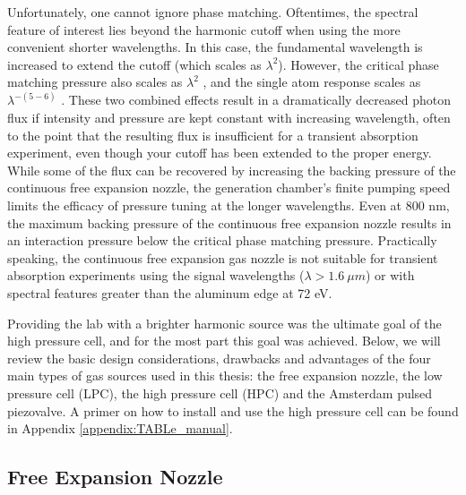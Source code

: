 Unfortunately, one cannot ignore phase matching. Oftentimes, the spectral feature of interest lies beyond the harmonic cutoff when using the more convenient shorter wavelengths. In this case, the fundamental wavelength is increased to extend the cutoff (which scales as $\lambda^2$). However, the critical phase matching pressure also scales as $\lambda^2$ \cite{popmintchevPhaseMatchingHigh2009}, and the single atom response scales as $\lambda^{-(5-6)}$ \cite{tateScalingWavePacketDynamics2007}. These two combined effects result in a dramatically decreased photon flux if intensity and pressure are kept constant with increasing wavelength, often to the point that the resulting flux is insufficient for a transient absorption experiment, even though your cutoff has been extended to the proper energy. While some of the flux can be recovered by increasing the backing pressure of the continuous free expansion nozzle, the generation chamber's finite pumping speed limits the efficacy of pressure tuning at the longer wavelengths. Even at 800 nm, the maximum backing pressure of the continuous free expansion nozzle results in an interaction pressure below the critical phase matching pressure. Practically speaking, the continuous free expansion gas nozzle is not suitable for transient absorption experiments using the signal wavelengths ($\lambda > 1.6 \ \mu m$) or with spectral features greater than the aluminum edge at 72 eV.

Providing the lab with a brighter harmonic source was the ultimate goal of the high pressure cell, and for the most part this goal was achieved. Below, we will review the basic design considerations, drawbacks and advantages of the four main types of gas sources used in this thesis: the free expansion nozzle, the low pressure cell (LPC), the high pressure cell (HPC) and the Amsterdam pulsed piezovalve. A primer on how to install and use the high pressure cell can be found in Appendix \ref{appendix:TABLe_manual}.

\subsection{Free Expansion Nozzle}
%

